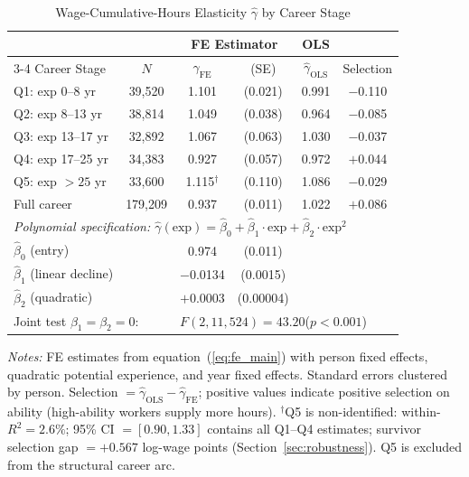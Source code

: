 \documentclass[12pt]{article}
\theoremstyle{definition}
\theoremstyle{remark}
\begin{document}
\begin{table}[htbp]
\centering
\caption{Wage-Cumulative-Hours Elasticity $\hat{\gamma}$ by Career Stage}
\label{tab:gamma}
\begin{threeparttable}
\small
\setlength{\tabcolsep}{5pt}
\begin{tabular}{lccccc}
\toprule
 & & \multicolumn{2}{c}{FE Estimator} & OLS & \\
\cmidrule(lr){3-4}
Career Stage & $N$ & $\hat{\gamma}_{\text{FE}}$ & (SE) & $\hat{\gamma}_{\text{OLS}}$ & Selection \\
\midrule
Q1: exp 0--8 yr    & 39,520  & 1.101 & (0.021) & 0.991 & $-$0.110 \\
Q2: exp 8--13 yr   & 38,814  & 1.049 & (0.038) & 0.964 & $-$0.085 \\
Q3: exp 13--17 yr  & 32,892  & 1.067 & (0.063) & 1.030 & $-$0.037 \\
Q4: exp 17--25 yr  & 34,383  & 0.927 & (0.057) & 0.972 & $+$0.044 \\
Q5: exp $> 25$ yr  & 33,600  & 1.115$^{\dagger}$ & (0.110) & 1.086 & $-$0.029 \\
\midrule
Full career        & 179,209 & 0.937 & (0.011) & 1.022 & $+$0.086 \\
\midrule
\multicolumn{6}{l}{\textit{Polynomial specification: $\hat{\gamma}(\text{exp}) = \hat{\beta}_0 + \hat{\beta}_1\cdot\text{exp} + \hat{\beta}_2\cdot\text{exp}^2$}} \\
$\hat{\beta}_0$ (entry) & & 0.974 & (0.011) & & \\
$\hat{\beta}_1$ (linear decline) & & $-$0.0134 & (0.0015) & & \\
$\hat{\beta}_2$ (quadratic) & & $+$0.0003 & (0.00004) & & \\
\multicolumn{2}{l}{Joint test $\beta_1 = \beta_2 = 0$:} & \multicolumn{4}{l}{$F(2, 11{,}524) = 43.20$\quad ($p < 0.001$)} \\
\bottomrule
\end{tabular}
\begin{tablenotes}
\small
\item \textit{Notes:} FE estimates from equation~(\ref{eq:fe_main}) with person fixed effects,
quadratic potential experience, and year fixed effects. Standard errors clustered by person.
Selection $= \hat{\gamma}_{\text{OLS}} - \hat{\gamma}_{\text{FE}}$; positive values indicate
positive selection on ability (high-ability workers supply more hours). $^{\dagger}$Q5 is
non-identified: within-$R^2 = 2.6\%$; 95\% CI $= [0.90, 1.33]$ contains all Q1--Q4 estimates;
survivor selection gap $= +0.567$ log-wage points (Section~\ref{sec:robustness}). Q5 is
excluded from the structural career arc.
\end{tablenotes}
\end{threeparttable}
\end{table}
\end{document}
